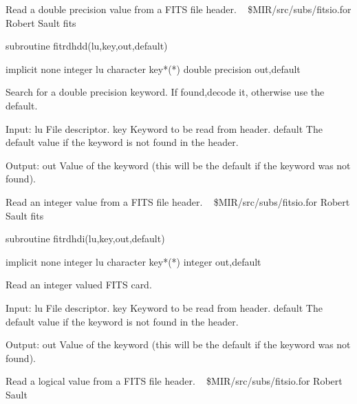 %
\noindent Read a double precision value from a FITS file header.
\newline \ 
\newline {} \$MIR/src/subs/fitsio.for
\newline {} Robert Sault
\newline {} fits
\par{\tenpoint
{\eightpoint\begintt
        subroutine fitrdhdd(lu,key,out,default)

        implicit none
        integer lu
        character key*(*)
        double precision out,default

  Search for a double precision keyword. If found,decode it, otherwise
  use the default.

  Input:
    lu         File descriptor.
    key        Keyword to be read from header.
    default    The default value if the keyword is not found in the header.

  Output:
    out        Value of the keyword (this will be the default if the
               keyword was not found).
\endtt}
\par}
%
\noindent Read an integer value from a FITS file header.
\newline \ 
\newline {} \$MIR/src/subs/fitsio.for
\newline {} Robert Sault
\newline \abox{Keywords:} fits
\par{\tenpoint
{\eightpoint\begintt
        subroutine fitrdhdi(lu,key,out,default)

        implicit none
        integer lu
        character key*(*)
        integer out,default

  Read an integer valued FITS card.

  Input:
    lu         File descriptor.
    key        Keyword to be read from header.
    default    The default value if the keyword is not found in the header.

  Output:
    out        Value of the keyword (this will be the default if the
               keyword was not found).
\endtt}
\par}
%
\noindent Read a logical value from a FITS file header.
\newline \ 
\newline {} \$MIR/src/subs/fitsio.for
\newline \abox{Responsible:} Robert Sault
